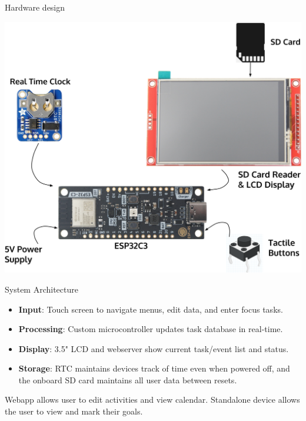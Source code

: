 \documentclass[final]{beamer}
\newlength{\colwidth}
\begin{document}
\begin{frame}[t]
\begin{columns}[t]
\begin{column}{\colwidth}
  \begin{block}{Hardware design}
    \begin{center}
      \includegraphics[width = \linewidth]{PrototypeDesign.png}
    \end{center}
  \end{block}

    \begin{block}{System Architecture} %
    
    \begin{itemize}
      \item \textbf{Input}: Touch screen to navigate menus, edit data, and enter focus tasks.
      \item \textbf{Processing}: Custom microcontroller updates task database in real-time.
      \item \textbf{Display}: 3.5" LCD and webserver show current task/event list and status.
      \item \textbf{Storage}: RTC maintains devices track of time even when powered off, and the onboard SD card maintains all user data between resets.
    \end{itemize}

    Webapp allows user to edit activities and view calendar. Standalone device allows the user to view and mark their goals.

  \end{block}


\end{column}
\end{columns}
\end{frame}
\end{document}

